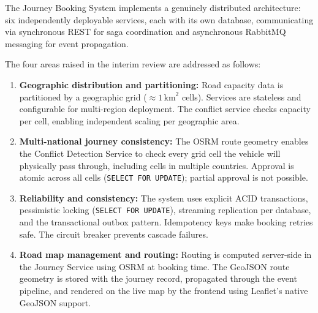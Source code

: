 \documentclass[12pt,a4paper]{article}
\begin{document}
The Journey Booking System implements a genuinely distributed architecture: six independently deployable services, each with its own database, communicating via synchronous REST for saga coordination and asynchronous RabbitMQ messaging for event propagation.

The four areas raised in the interim review are addressed as follows:

\begin{enumerate}[leftmargin=*]
  \item \textbf{Geographic distribution and partitioning:} Road capacity data is partitioned by a geographic grid (${\approx}1\,\text{km}^2$ cells). Services are stateless and configurable for multi-region deployment. The conflict service checks capacity per cell, enabling independent scaling per geographic area.

  \item \textbf{Multi-national journey consistency:} The OSRM route geometry enables the Conflict Detection Service to check every grid cell the vehicle will physically pass through, including cells in multiple countries. Approval is atomic across all cells (\texttt{SELECT FOR UPDATE}); partial approval is not possible.

  \item \textbf{Reliability and consistency:} The system uses explicit ACID transactions, pessimistic locking (\texttt{SELECT FOR UPDATE}), streaming replication per database, and the transactional outbox pattern. Idempotency keys make booking retries safe. The circuit breaker prevents cascade failures.

  \item \textbf{Road map management and routing:} Routing is computed server-side in the Journey Service using OSRM at booking time. The GeoJSON route geometry is stored with the journey record, propagated through the event pipeline, and rendered on the live map by the frontend using Leaflet's native GeoJSON support.
\end{enumerate}
\end{document}
